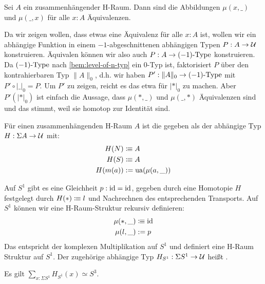 \begin{lemma}
  Sei $A$ ein zusammenhängender H-Raum. Dann sind die Abbildungen $\mu(x,\_)$ und $\mu(\_,x)$ für alle $x:A$ Äquivalenzen.
\end{lemma}
\begin{beweis}
  Da wir zeigen wollen, dass etwas eine Äquivalenz für alle $x:A$ ist, wollen wir ein abhängige Funktion in einem $-1$-abgeschnittenen abhängigen Typen $P:A\to\mathcal{U}$ konstruieren.
  Äquivalen können wir also auch $P:A\to (-1)\hbox{-}\mathrm{Type}$ konstruieren.
  Da $(-1)\hbox{-}\mathrm{Type}$ nach \cref{bem:level-of-n-typ} ein $0$-Typ ist, faktorisiert $P$ über den kontrahierbaren Typ $\|A\|_0$,
  d.h. wir haben $P':\|A\|_0\to (-1)\hbox{-}\mathrm{Type}$ mit $P'\circ |\_|_0=P$.
  Um $P'$ zu zeigen, reicht es das etwa für $|\ast|_0$ zu machen. Aber $P'(|\ast|_0)$ ist einfach die Aussage, dass $\mu(\ast,\_)$ und $\mu(\_,\ast)$ Äquivalenzen sind und das stimmt, weil sie homotop zur Identität sind.
\end{beweis}

\begin{definition}
  Für einen zusammenhängenden H-Raum $A$ ist die  gegeben als der abhängige Typ $H:\Sigma A\to\mathcal{U}$ mit:
  \begin{align*}
    H(N)&\vcentcolon\mspace{-1.2mu}\equiv A \\
    H(S)&\vcentcolon\mspace{-1.2mu}\equiv A \\
    H(m(a))&:= \mathrm{ua}(\mu(a,\_))
  \end{align*}
\end{definition}

\begin{beispiel}
  Auf $S^1$ gibt es eine Gleichheit $p:\mathrm{id}=\mathrm{id}$, gegeben durch eine Homotopie $H$ festgelegt durch $H(\ast)\vcentcolon\mspace{-1.2mu}\equiv l$ und Nachrechnen des entsprechenden Transports.
  Auf $S^1$ können wir eine H-Raum-Struktur rekursiv definieren:
  \begin{align*}
    \mu(\ast,\_)&\vcentcolon\mspace{-1.2mu}\equiv \mathrm{id} \\
    \mu(l,\_)&:=  p
  \end{align*}
  Das entspricht der komplexen Multiplikation auf $S^1$ und definiert eine H-Raum Struktur auf $S^1$.
  Der zugehörige abhängige Typ $H_{S^1}:\Sigma S^1\to\mathcal{U}$ heißt .
\end{beispiel}

\begin{fakt}
  Es gilt $\sum_{x:\Sigma S^1}H_{S^1}(x)\simeq S^3$.
\end{fakt}

